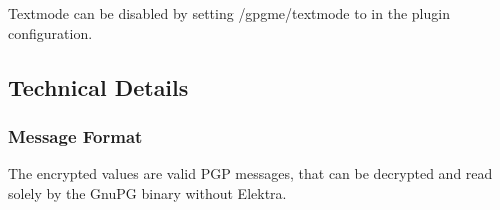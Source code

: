 Textmode can be disabled by setting {\ttfamily /gpgme/textmode} to {} in the plugin configuration.

\subsection*{Technical Details}

\subsubsection*{Message Format}

The encrypted values are valid P\+GP messages, that can be decrypted and read solely by the Gnu\+PG binary without Elektra. 